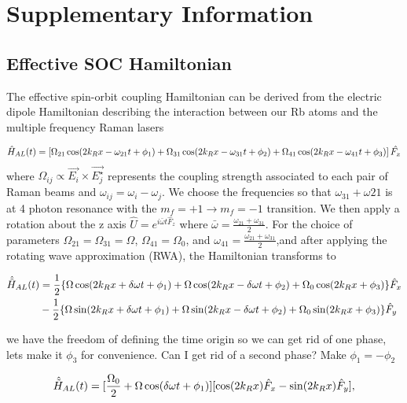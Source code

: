 \section{Supplementary Information}


\subsection{Effective SOC Hamiltonian}	
The effective spin-orbit coupling Hamiltonian can be derived from the electric dipole Hamiltonian describing the interaction between our Rb atoms and the multiple frequency Raman lasers


\begin{align}
	\hat{H}_{AL}(t) = \left[\Omega_{21}\cos(2{{k_R}} x-\omega_{21} t +\phi_1)+\Omega_{31}\cos(2{{k_R}} x-\omega_{31} t+\phi_2)+\Omega_{41}\cos(2{{k_R}} x-\omega_{41} t + \phi_3)\right]\hat{F_x}
\end{align}
%
where $\Omega_{ij}\propto \vec{E_i}\times\vec{E_j^{\star}}$ represents the coupling strength associated to each pair of Raman beams and $\omega_{ij} = \omega_{i}-\omega_{j} $. We choose the frequencies so that $\omega_{31} + \omega{21}$ is at 4 photon resonance with the $m_f = +1\rightarrow m_f = -1$ transition. We then apply a rotation about the z axis $\hat{U} = e^{i\bar{\omega} t\hat{F}_z}$ where $\bar{\omega} = \frac{\omega_{21}+\omega_{31}}{2}$. For the choice of parameters 
$\Omega_{21} =\Omega_{31} = \Omega $, $\Omega_{41}=\Omega_0$, and $\omega_{41} =\frac{\omega_{21}+\omega_{31}}{2}$,and after applying the rotating wave approximation (RWA), the Hamiltonian transforms to  
%
%

	
\begin{align}
	\begin{split}
		\hat{\tilde{H}}_{AL}(t) &= \frac{1}{2}\lbrace\Omega\cos(2{{k_R}} x+\delta\omega t +\phi_1)+\Omega\cos(2{{k_R}} x-\delta\omega t + \phi_2) +\Omega_0\cos(2{{k_R}} x + \phi_3)\rbrace \hat{F}_x \\
		& -  \frac{1}{2}\lbrace\Omega\sin(2{{k_R}} x+\delta\omega t +\phi_1)+\Omega\sin(2{{k_R}} x-\delta\omega t +\phi_2)+\Omega_0\sin(2{{k_R}} x +\phi_3)\rbrace \hat{F}_y
	\end{split}
\end{align}

we have the freedom of defining the time origin so we can get rid of one phase, lets make it $\phi_3$ for convenience. Can I get rid of a second phase? Make $\phi_1 = -\phi_2$
 
\begin{align}
 	\begin{split}
 		\hat{\tilde{H}}_{AL}(t)  = [\frac{\Omega_0}{2} + \Omega\cos(\delta\omega t+\phi_1)][\cos(2{{k_R}} x)\hat{F}_x - \sin(2{{k_R}} x)\hat{F}_y],
 	\end{split}
\end{align}


